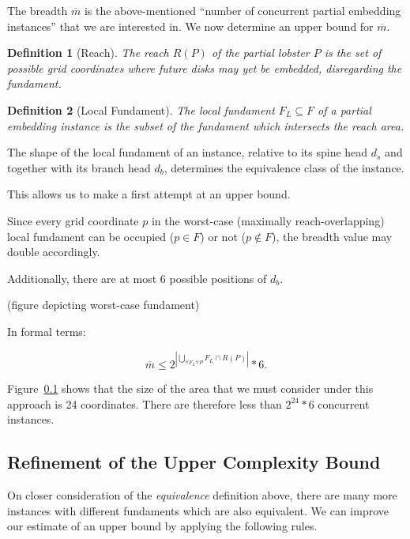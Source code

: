\documentclass[draft,final]{vutinfth} %
\newtheorem{definition}{Definition}
\begin{document}
The breadth $\overline{m}$ is the above-mentioned ``number of concurrent partial embedding instances'' that we are interested in.
We now determine an upper bound for $\overline{m}$.

\begin{definition}[Reach]
The \emph{reach} $R(P)$ of the partial lobster $P$ is the set of possible grid coordinates where future disks may yet be embedded, disregarding the fundament.
\end{definition}

\begin{definition}[Local Fundament]
The \emph{local fundament} $F_L \subseteq F$ of a partial embedding instance is the subset of the fundament which intersects the reach area.
\end{definition}

The shape of the local fundament of an instance, relative to its spine head $d_s$ and together with its branch head $d_b$, determines the equivalence class of the instance.

This allows us to make a first attempt at an upper bound.

Since every grid coordinate $p$ in the worst-case (maximally reach-overlapping) local fundament can be occupied ($p \in F$) or not ($p \not\in F$), the breadth value may double accordingly.

Additionally, there are at most 6 possible positions of $d_b$.

(figure depicting worst-case fundament)

In formal terms:

\begin{equation}
    \overline m \leq 2^{\left\lvert \bigcup\limits_{\forall F_L \forall P} F_L \cap R(P) \right\rvert} * 6.
\end{equation}

Figure~\ref{} shows that the size of the area that we must consider under this approach is 24 coordinates. There are therefore less than $2^{24}*6$ concurrent instances.

\subsection{Refinement of the Upper Complexity Bound}

On closer consideration of the \emph{equivalence} definition above, there are many more instances with different fundaments which are also equivalent. We can improve our estimate of an upper bound by applying the following rules.
\end{document}

